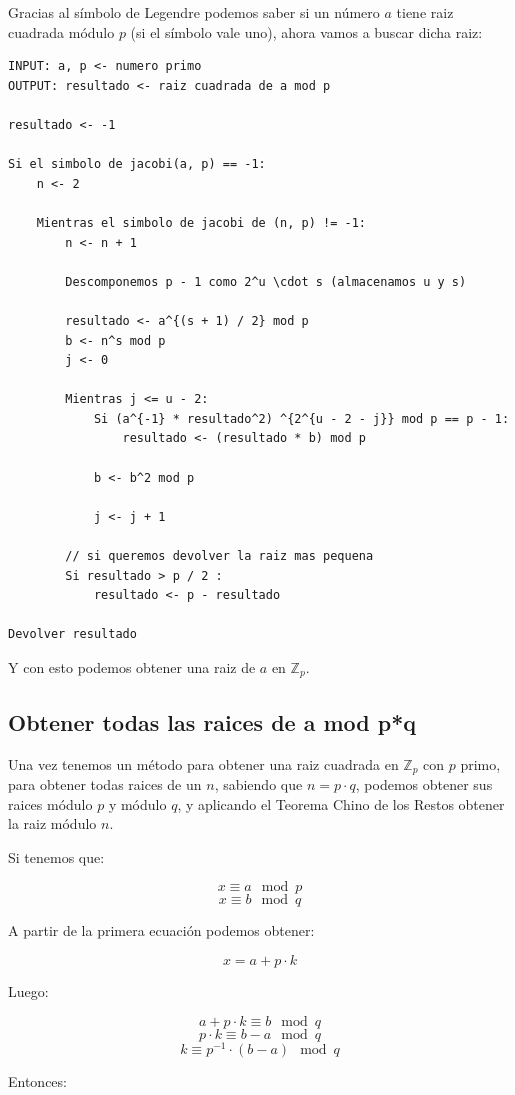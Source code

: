 \documentclass[12pt, spanish]{article}
\begin{document}
Gracias al símbolo de Legendre podemos saber si un número $a$ tiene raiz cuadrada módulo $p$ (si el símbolo vale uno), ahora vamos a buscar dicha raiz:


\begin{lstlisting}[caption={Algoritmo para obtener la raiz cuadrada modular}]
INPUT: a, p <- numero primo
OUTPUT: resultado <- raiz cuadrada de a mod p

resultado <- -1

Si el simbolo de jacobi(a, p) == -1:
	n <- 2

	Mientras el simbolo de jacobi de (n, p) != -1:
		n <- n + 1

		Descomponemos p - 1 como 2^u \cdot s (almacenamos u y s)

		resultado <- a^{(s + 1) / 2} mod p
		b <- n^s mod p
		j <- 0

		Mientras j <= u - 2:
			Si (a^{-1} * resultado^2) ^{2^{u - 2 - j}} mod p == p - 1:
				resultado <- (resultado * b) mod p

			b <- b^2 mod p

			j <- j + 1

		// si queremos devolver la raiz mas pequena
		Si resultado > p / 2 :
			resultado <- p - resultado

Devolver resultado
\end{lstlisting}

Y con esto podemos obtener una raiz de $a$ en $\mathbb{Z}_p$.

\subsection{Obtener todas las raices de a mod p*q}

Una vez tenemos un método para obtener una raiz cuadrada en $\mathbb{Z}_p$ con $p$ primo, para obtener todas raices de un $n$, sabiendo que $n = p \cdot q$, podemos obtener sus raices módulo $p$ y módulo $q$, y aplicando el Teorema Chino de los Restos obtener la raiz módulo $n$.

Si tenemos que:

$$x \equiv a \mod p$$
$$x \equiv b \mod q$$

A partir de la primera ecuación podemos obtener:

$$x = a + p \cdot k$$

Luego:

$$a + p \cdot k \equiv b \mod q$$
$$p \cdot k \equiv b - a \mod q$$
$$k \equiv p^{-1} \cdot (b - a) \mod q$$

Entonces:
\end{document}

